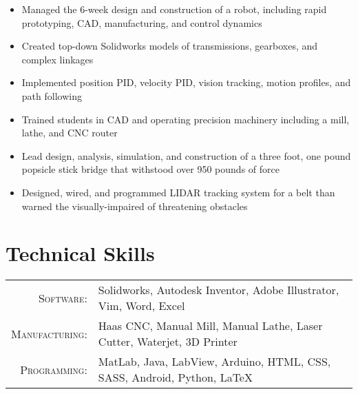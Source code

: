 \documentclass{resume}
\begin{document}
\begin{itemize}
  \item Managed the 6-week design and construction of a robot, including rapid prototyping, CAD, manufacturing, and control dynamics
  \item Created top-down Solidworks models of transmissions, gearboxes, and complex linkages
  \item Implemented position PID, velocity PID, vision tracking, motion profiles, and path following
  \item Trained students in CAD and operating precision machinery including a mill, lathe, and CNC router
\end{itemize}

\begin{itemize}
  \item Lead design, analysis, simulation, and construction of a three foot, one pound popsicle stick bridge that withstood over 950 pounds of force
\end{itemize}


\begin{itemize}
  \item Designed, wired, and programmed LIDAR tracking system for a belt than warned the visually-impaired of threatening obstacles
\end{itemize}


\section{Technical Skills}
\begin{tabular}{rl}
  \textsc{Software:}   & Solidworks, Autodesk Inventor, Adobe Illustrator, Vim, Word, Excel\\
  \textsc{Manufacturing:}   & Haas CNC, Manual Mill, Manual Lathe, Laser Cutter, Waterjet, 3D Printer\\
  \textsc{Programming:}  & MatLab, Java, LabView, Arduino, HTML, CSS, SASS, Android, Python, \LaTeX\\
\end{tabular}
\end{document}
